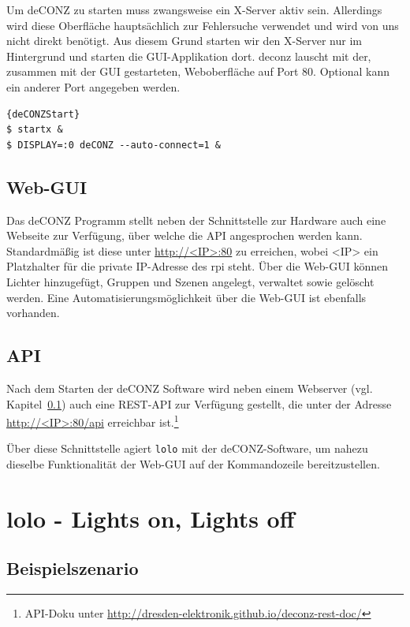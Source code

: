 \documentclass[a4paper,12pt]{article}
\begin{document}
Um deCONZ zu starten muss zwangsweise ein X-Server aktiv sein. Allerdings wird diese
Oberfläche hauptsächlich zur Fehlersuche verwendet und wird von uns nicht direkt benötigt.
Aus diesem Grund starten wir den X-Server nur im Hintergrund und starten die GUI-Applikation
dort.
\acrshort{deconz} lauscht mit der, zusammen mit der GUI gestarteten, Weboberfläche auf Port 80.
Optional kann ein anderer Port
angegeben werden.

\begin{lstlisting}[caption=deCONZ starten]{deCONZStart}
$ startx &
$ DISPLAY=:0 deCONZ --auto-connect=1 &
\end{lstlisting}

\subsection{Web-GUI}
\label{ss:webgui}

Das deCONZ Programm stellt neben der Schnittstelle zur Hardware auch eine Webseite zur
Verfügung, über welche die API angesprochen werden kann.
Standardmäßig ist diese unter \url{http://<IP>:80} zu erreichen, wobei <IP> ein
Platzhalter für die private IP-Adresse des \gls{rpi} steht. Über die Web-GUI können Lichter
hinzugefügt, Gruppen und Szenen angelegt, verwaltet sowie gelöscht werden. Eine
Automatisierungsmöglichkeit über die Web-GUI ist ebenfalls vorhanden.

\subsection{API}

Nach dem Starten der deCONZ Software wird neben einem Webserver (vgl. 
Kapitel~\ref{ss:webgui}) auch eine REST-API zur Verfügung gestellt, die unter
der Adresse \url{http://<IP>:80/api} erreichbar ist.\footnote{API-Doku unter \url{http://dresden-elektronik.github.io/deconz-rest-doc/}}

Über diese Schnittstelle agiert \texttt{lolo} mit der deCONZ-Software, um nahezu
dieselbe Funktionalität der Web-GUI auf der Kommandozeile bereitzustellen.

\newpage

\section{lolo - Lights on, Lights off}
\label{lolo}

\subsection{Beispielszenario}
\end{document}
